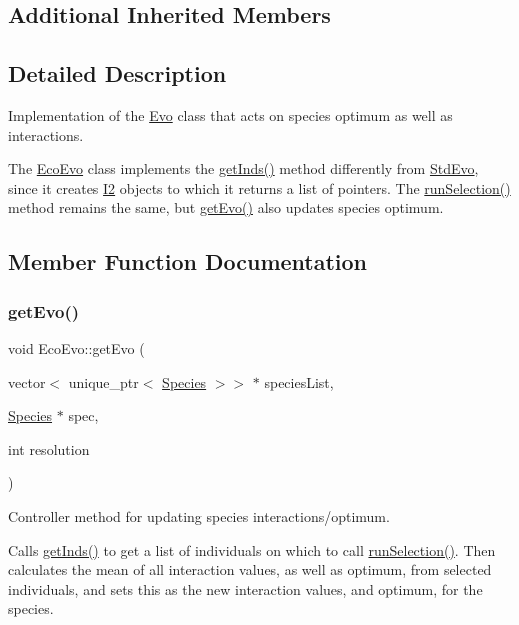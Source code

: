 \subsection*{Additional Inherited Members}


\subsection{Detailed Description}
Implementation of the \hyperlink{classEvo}{Evo} class that acts on species optimum as well as interactions. 

The \hyperlink{classEcoEvo}{Eco\+Evo} class implements the \hyperlink{classEcoEvo_a819363c533784efea949ebc70a6d4636}{get\+Inds()} method differently from \hyperlink{classStdEvo}{Std\+Evo}, since it creates \hyperlink{classI2}{I2} objects to which it returns a list of pointers. The \hyperlink{classEcoEvo_adfd00eb377489649a279e567abc3ae94}{run\+Selection()} method remains the same, but \hyperlink{classEcoEvo_a93564a6d93cdc1802182273c353e0552}{get\+Evo()} also updates species optimum. 

\subsection{Member Function Documentation}
\hypertarget{classEcoEvo_a93564a6d93cdc1802182273c353e0552}{}\label{classEcoEvo_a93564a6d93cdc1802182273c353e0552} 
\subsubsection{\texorpdfstring{get\+Evo()}{getEvo()}}
{\footnotesize\ttfamily void Eco\+Evo\+::get\+Evo (\begin{DoxyParamCaption}\item[{vector$<$ unique\+\_\+ptr$<$ \hyperlink{classSpecies}{Species} $>$$>$ $\ast$}]{species\+List,  }\item[{\hyperlink{classSpecies}{Species} $\ast$}]{spec,  }\item[{int}]{resolution }\end{DoxyParamCaption})\hspace{0.3cm}{\ttfamily [virtual]}}



Controller method for updating species interactions/optimum. 

Calls \hyperlink{classEcoEvo_a819363c533784efea949ebc70a6d4636}{get\+Inds()} to get a list of individuals on which to call \hyperlink{classEcoEvo_adfd00eb377489649a279e567abc3ae94}{run\+Selection()}. Then calculates the mean of all interaction values, as well as optimum, from selected individuals, and sets this as the new interaction values, and optimum, for the species.


